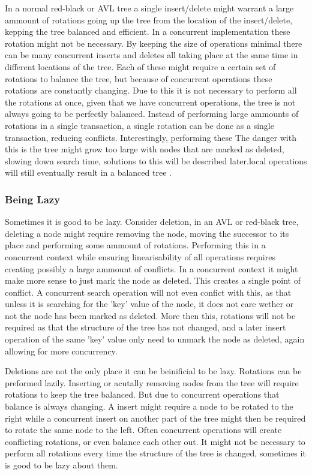 \documentclass[10pt]{sigplanconf}
\begin{document}
In a normal red-black or AVL tree a single insert/delete might warrant a large ammount of rotations going up the tree from the location of the insert/delete,
kepping the tree balanced and efficient.
In a concurrent implementation these rotation might not be necessary.
By keeping the size of operations minimal there can be many concurrent inserts and deletes all taking place at the same time in different locations of the tree.
Each of these might require a certain set of rotations to balance the tree, but because of concurrent operations these rotations are constantly changing.
Due to this it is not necessary to perform all the rotations at once, given that we have concurrent operations, the tree is not always going to be perfectly balanced.
Instead of performing large ammounts of rotations in a single transaction, a single rotation can be done as a single transaction, reducing conflicts.
Interestingly, performing these The danger with this is the tree might grow too large with nodes that are marked as deleted, slowing down search time, solutions to this will be
described later.local operations will still eventually result in a balanced tree \cite{}.

\subsubsection{Being Lazy}
Sometimes it is good to be lazy.
Consider deletion, in an AVL or red-black tree, deleting a node might require removing the node, moving the successor to its place and performing
some ammount of rotations.
Performing this in a concurrent context while ensuring linearisability of all operations requires creating possibly a large ammount of conflicts.
In a concurrent context it might make more sense to just mark the node as deleted.
This creates a single point of conflict.
A concurrent search operation will not even confict with this, as that unless it is searching for the 'key' value of the node, it does not care wether
or not the node has been marked as deleted.
More then this, rotations will not be required as that the structure of the tree has not changed, and a later insert operation of the same 'key'
value only need to unmark the node as deleted, again allowing for more concurrency.

Deletions are not the only place it can be beinificial to be lazy.
Rotations can be preformed lazily.
Inserting or acutally removing nodes from the tree will require rotations to keep the tree balanced.
But due to concurrent operations that balance is always changing.
A insert might require a node to be rotated to the right while a concurrent insert on another part of the tree might then be required to rotate the same node to the left.
Often concurrent operations will create conflicting rotations, or even balance each other out.
It might not be necessary to perform all rotations every time the structure of the tree is changed, sometimes it is good to be lazy about them.
\end{document}
